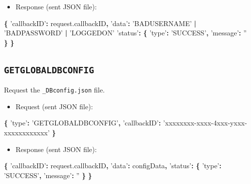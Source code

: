 \documentclass[]{book}
\newenvironment{Shaded}{\begin{snugshade}}{\end{snugshade}}
\newcommand{\AttributeTok}[1]{\textcolor[rgb]{0.77,0.63,0.00}{#1}}
\newcommand{\NormalTok}[1]{#1}
\newcommand{\OperatorTok}[1]{\textcolor[rgb]{0.81,0.36,0.00}{\textbf{#1}}}
\newcommand{\StringTok}[1]{\textcolor[rgb]{0.31,0.60,0.02}{#1}}
\newcommand{\VariableTok}[1]{\textcolor[rgb]{0.00,0.00,0.00}{#1}}
\providecommand{\tightlist}{%
  \setlength{\itemsep}{0pt}\setlength{\parskip}{0pt}}
\theoremstyle{definition}
\theoremstyle{definition}
\theoremstyle{definition}
\theoremstyle{remark}
\begin{document}
\begin{itemize}
\tightlist
\item
  Response (sent JSON file):
\end{itemize}

\begin{Shaded}
\begin{Highlighting}[]
\OperatorTok{\{}
  \StringTok{'callbackID'}\OperatorTok{:} \VariableTok{request}\NormalTok{.}\AttributeTok{callbackID}\OperatorTok{,}
  \StringTok{'data'}\OperatorTok{:} \StringTok{'BADUSERNAME'} \OperatorTok{|} \StringTok{'BADPASSWORD'} \OperatorTok{|} \StringTok{'LOGGEDON'}
  \StringTok{'status'}\OperatorTok{:} \OperatorTok{\{}
    \StringTok{'type'}\OperatorTok{:} \StringTok{'SUCCESS'}\OperatorTok{,}
    \StringTok{'message'}\OperatorTok{:} \StringTok{''}
  \OperatorTok{\}}
\OperatorTok{\}}
\end{Highlighting}
\end{Shaded}

\hypertarget{getglobaldbconfig}{%
\subsection{\texorpdfstring{\texttt{GETGLOBALDBCONFIG}}{GETGLOBALDBCONFIG}}\label{getglobaldbconfig}}

Request the \texttt{\_DBconfig.json} file.

\begin{itemize}
\tightlist
\item
  Request (sent JSON file):
\end{itemize}

\begin{Shaded}
\begin{Highlighting}[]
\OperatorTok{\{}
  \StringTok{'type'}\OperatorTok{:} \StringTok{'GETGLOBALDBCONFIG'}\OperatorTok{,}
  \StringTok{'callbackID'}\OperatorTok{:} \StringTok{'xxxxxxxx-xxxx-4xxx-yxxx-xxxxxxxxxxxx'}
\OperatorTok{\}}
\end{Highlighting}
\end{Shaded}

\begin{itemize}
\tightlist
\item
  Response (sent JSON file):
\end{itemize}

\begin{Shaded}
\begin{Highlighting}[]
\OperatorTok{\{}
  \StringTok{'callbackID'}\OperatorTok{:} \VariableTok{request}\NormalTok{.}\AttributeTok{callbackID}\OperatorTok{,}
  \StringTok{'data'}\OperatorTok{:}\NormalTok{ configData}\OperatorTok{,}
  \StringTok{'status'}\OperatorTok{:} \OperatorTok{\{}
    \StringTok{'type'}\OperatorTok{:} \StringTok{'SUCCESS'}\OperatorTok{,}
    \StringTok{'message'}\OperatorTok{:} \StringTok{''}
  \OperatorTok{\}}
\OperatorTok{\}}
\end{Highlighting}
\end{Shaded}
\end{document}
